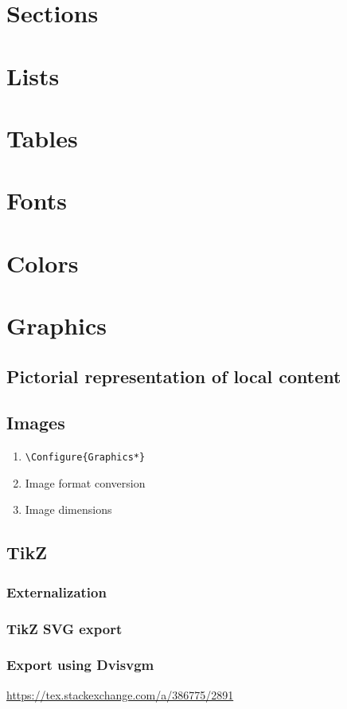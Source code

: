 \documentclass{book}
\begin{document}
\section{Sections}
\section{Lists}
\section{Tables}

\section{Fonts}
\section{Colors}

\section{Graphics}
\subsection{Pictorial representation of local content}
\subsection{Images}
\begin{enumerate}
  \item \verb|\Configure{Graphics*}|
  \item Image format conversion
  \item Image dimensions
\end{enumerate}
\subsection{TikZ}
\subsubsection{Externalization}
\subsubsection{TikZ SVG export}
\subsubsection{Export using Dvisvgm}
\url{https://tex.stackexchange.com/a/386775/2891}
\end{document}

